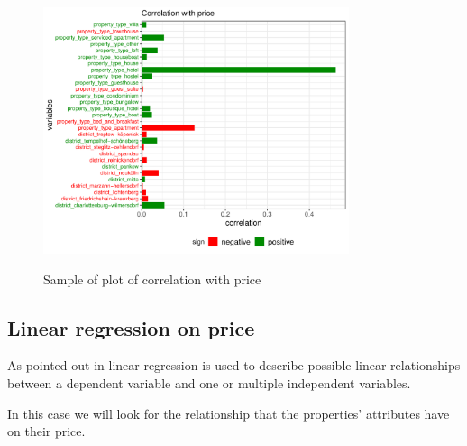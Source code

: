 


\begin{figure}[H]
\begin{center}
\includegraphics[width=0.8\textwidth, keepaspectratio]{price_correlation.pdf} \\
\caption{Sample of plot of correlation with price}
\label{figure:pricecorr}
\end{center}
\end{figure}



\subsection{Linear regression on price}\label{subsec:lm}

As pointed out in \cite{wang2017price} linear regression is used to describe possible linear relationships between a dependent variable and one or multiple independent variables.

In this case we will look for the relationship that the properties' attributes have on their price. 

